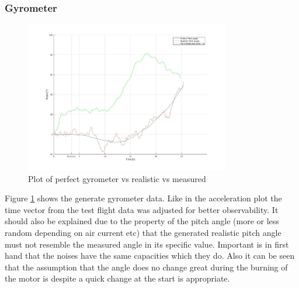 \subsubsection{Gyrometer}
\begin{figure}[h!]
 \centering
 \includegraphics[width=0.8\textwidth]{./Pictures/PitchPerfVSReal.jpg}
 \caption{Plot of perfect gyrometer vs realistic vs measured}
 \label{fig:PtichPerVSReal}
\end{figure}
Figure \ref{fig:PtichPerVSReal} shows the generate gyrometer data.
Like in the acceleration plot the time vector from the test flight data was adjusted for better observability.
It should also be explained due to the property of the pitch angle (more or less random depending on air current etc) 
that the generated realistic pitch angle must not resemble the measured angle in its specific value.
Important is in first hand that the noises have the same capacities which they do.
Also it can be seen that the assumption that the angle does no change great during the burning of the motor is despite a quick change at the start is appropriate.

\newpage
